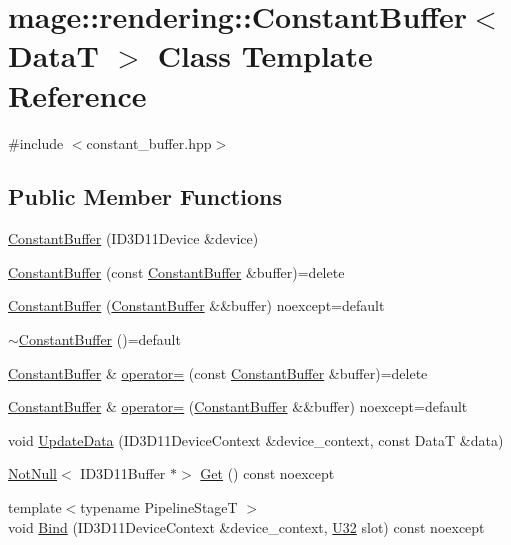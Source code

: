 \hypertarget{classmage_1_1rendering_1_1_constant_buffer}{}\section{mage\+:\+:rendering\+:\+:Constant\+Buffer$<$ DataT $>$ Class Template Reference}
\label{classmage_1_1rendering_1_1_constant_buffer}


{\ttfamily \#include $<$constant\+\_\+buffer.\+hpp$>$}

\subsection*{Public Member Functions}
\begin{DoxyCompactItemize}
\item 
\hyperlink{classmage_1_1rendering_1_1_constant_buffer_a588d67fc6c3cf6317416b422d0442a5c}{Constant\+Buffer} (I\+D3\+D11\+Device \&device)
\item 
\hyperlink{classmage_1_1rendering_1_1_constant_buffer_a85af57c527713b8d877524d9f6ce4587}{Constant\+Buffer} (const \hyperlink{classmage_1_1rendering_1_1_constant_buffer}{Constant\+Buffer} \&buffer)=delete
\item 
\hyperlink{classmage_1_1rendering_1_1_constant_buffer_a615874bb60bdde1075ae912d7e5b7a37}{Constant\+Buffer} (\hyperlink{classmage_1_1rendering_1_1_constant_buffer}{Constant\+Buffer} \&\&buffer) noexcept=default
\item 
\hyperlink{classmage_1_1rendering_1_1_constant_buffer_a9c8ea67e36a9e80cfaabebdc0de2fae7}{$\sim$\+Constant\+Buffer} ()=default
\item 
\hyperlink{classmage_1_1rendering_1_1_constant_buffer}{Constant\+Buffer} \& \hyperlink{classmage_1_1rendering_1_1_constant_buffer_a8f07be2e30097690c88d4eb3338dbd5f}{operator=} (const \hyperlink{classmage_1_1rendering_1_1_constant_buffer}{Constant\+Buffer} \&buffer)=delete
\item 
\hyperlink{classmage_1_1rendering_1_1_constant_buffer}{Constant\+Buffer} \& \hyperlink{classmage_1_1rendering_1_1_constant_buffer_a25b1945f44cfbb7fd96bc146ca76adc7}{operator=} (\hyperlink{classmage_1_1rendering_1_1_constant_buffer}{Constant\+Buffer} \&\&buffer) noexcept=default
\item 
void \hyperlink{classmage_1_1rendering_1_1_constant_buffer_ac2b445fa570a1aadae959a60c840da73}{Update\+Data} (I\+D3\+D11\+Device\+Context \&device\+\_\+context, const DataT \&data)
\item 
\hyperlink{namespacemage_a8769f9d670d6b585ea306cb1062af94b}{Not\+Null}$<$ I\+D3\+D11\+Buffer $\ast$$>$ \hyperlink{classmage_1_1rendering_1_1_constant_buffer_abdb0c7d40b2464db5b18b4e3d46adcd8}{Get} () const noexcept
\item 
{\footnotesize template$<$typename Pipeline\+StageT $>$ }\\void \hyperlink{classmage_1_1rendering_1_1_constant_buffer_a810344fa71c98ee900f717351587a2f3}{Bind} (I\+D3\+D11\+Device\+Context \&device\+\_\+context, \hyperlink{namespacemage_a41c104c036fba3756a74e19f793eeaa1}{U32} slot) const noexcept
\end{DoxyCompactItemize}
